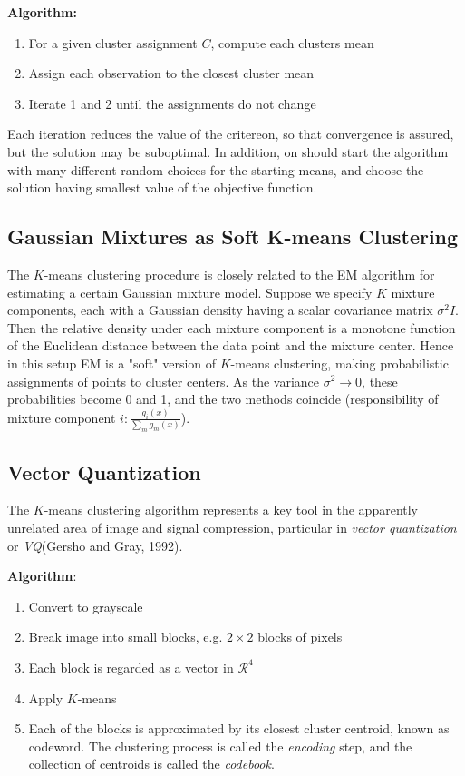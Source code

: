 \textbf{Algorithm:}
\begin{enumerate}
    \item For a given cluster assignment \(C\), compute each clusters mean
    \item Assign each observation to the closest cluster mean
    \item Iterate 1 and 2 until the assignments do not change
\end{enumerate}

Each iteration reduces the value of the critereon, so that convergence is assured, but the solution may be suboptimal. In addition, on should start the algorithm with many different random choices for the starting means, and choose the solution having smallest value of the objective function.

\subsection*{Gaussian Mixtures as Soft K-means Clustering}
The \(K\)-means clustering procedure is closely related to the EM algorithm for estimating a certain Gaussian mixture model. Suppose we specify \(K\) mixture components, each with a Gaussian density having a scalar covariance matrix \(\sigma^2 I\). Then the relative density under each mixture component is a monotone function of the Euclidean distance between the data point and the mixture center. Hence in this setup EM is a "soft" version of \(K\)-means clustering, making probabilistic assignments of points to cluster centers. As the variance \(\sigma^2 \rightarrow 0\), these probabilities become 0 and 1, and the two methods coincide (responsibility of mixture component \(i: \frac{g_i(x)}{\sum_m g_m(x)}\)).

\subsection*{Vector Quantization}
The \(K\)-means clustering algorithm represents a key tool in the apparently unrelated area of image and signal compression, particular in \textit{vector quantization} or \textit{VQ}(Gersho and Gray, 1992).

\textbf{Algorithm}:
\begin{enumerate}
    \item Convert to grayscale
    \item Break image into small blocks, e.g. \(2 \times 2\) blocks of pixels
    \item Each block is regarded as a vector in \(\mathcal{R}^4\)
    \item Apply \(K\)-means
    \item Each of the blocks is approximated by its closest cluster centroid, known as codeword. The clustering process is called the \textit{encoding} step, and the collection of centroids is called the \textit{codebook}.
\end{enumerate}

